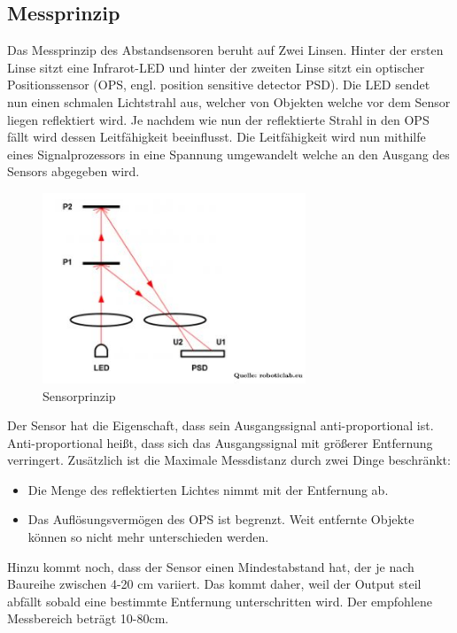 \documentclass[TGAI_Laborbericht.tex]{subfiles}
\begin{document}
\subsection*{Messprinzip}
\begin{flushleft}
Das Messprinzip des Abstandsensoren beruht auf Zwei Linsen. Hinter der ersten Linse sitzt eine Infrarot-LED und hinter der zweiten Linse sitzt ein optischer Positionssensor (OPS, engl. position sensitive detector PSD). Die LED sendet nun einen schmalen Lichtstrahl aus, welcher von Objekten welche vor dem Sensor liegen reflektiert wird. Je nachdem wie nun der reflektierte Strahl in den OPS fällt wird dessen Leitfähigkeit beeinflusst. Die Leitfähigkeit wird nun mithilfe eines Signalprozessors in eine Spannung umgewandelt welche an den Ausgang des Sensors abgegeben wird.
\begin{figure}
	\includegraphics[width=0.7\textwidth]{media/Sharp.jpg}
	\caption{Sensorprinzip}
	\label{fig:Sensor}
\end{figure}
\par
Der Sensor hat die Eigenschaft, dass sein Ausgangssignal anti-proportional ist. Anti-proportional heißt, dass sich das Ausgangssignal mit größerer Entfernung verringert. Zusätzlich ist die Maximale Messdistanz durch zwei Dinge beschränkt:
\begin{itemize}
\item Die Menge des reflektierten Lichtes nimmt mit der Entfernung ab.
\item Das Auflösungsvermögen des OPS ist begrenzt. Weit entfernte Objekte können so nicht mehr unterschieden werden.
\end{itemize}
Hinzu kommt noch, dass der Sensor einen Mindestabstand hat, der je nach Baureihe zwischen 4-20 cm variiert. Das kommt daher, weil der Output steil abfällt sobald eine bestimmte Entfernung unterschritten wird. Der empfohlene Messbereich beträgt 10-80cm.
\par

\end{flushleft}
\end{document}
